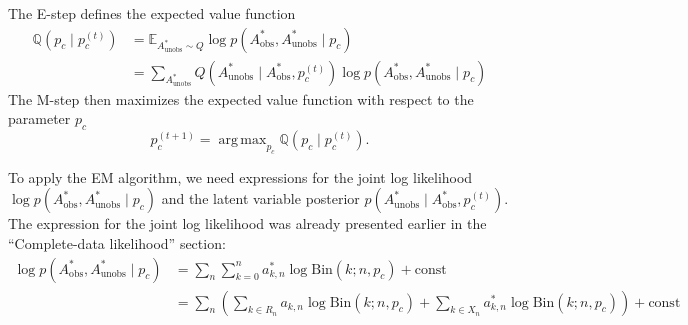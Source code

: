 \documentclass[11pt]{article}
\DeclareMathOperator*{\argmax}{arg\,max}
\begin{document}
The E-step defines the expected value function
$$
\begin{aligned}
\mathbb{Q}(p_c \mid p_c^{(t)})
&= \mathbb{E}_{A_\text{unobs}^* \sim Q} \log p(A_\text{obs}^*, A_\text{unobs}^* \mid p_c) \\
&= \sum_{A_\text{unobs}^*} Q(A_\text{unobs}^* \mid A_\text{obs}^*, p_c^{(t)}) \log p(A_\text{obs}^*, A_\text{unobs}^* \mid p_c)
\end{aligned}
$$
The M-step then maximizes the expected value function with respect to the parameter $p_c$
$$
p_c^{(t+1)} = \argmax_{p_c} \mathbb{Q}(p_c \mid p_c^{(t)}).
$$

To apply the EM algorithm, we need expressions for the joint log likelihood $\log p(A_\text{obs}^*, A_\text{unobs}^* \mid p_c)$ and the latent variable posterior $p(A_\text{unobs}^* \mid A_\text{obs}^*, p_c^{(t)})$. The expression for the joint log likelihood was already presented earlier in the ``Complete-data likelihood'' section:
\[
\begin{aligned}
\log p(A_\text{obs}^*, A_\text{unobs}^* \mid p_c)
&= \sum_n\sum_{k=0}^n a^*_{k,n}\log \mathrm{Bin}(k;n,p_c) + \text{const} \\
&= \sum_n \left( \sum_{k \in R_n} a_{k,n} \log \mathrm{Bin}(k; n, p_c) + \sum_{k \in X_n} a^*_{k,n} \log \mathrm{Bin}(k; n, p_c) \right) + \text{const}
\end{aligned}
\]
\end{document}
